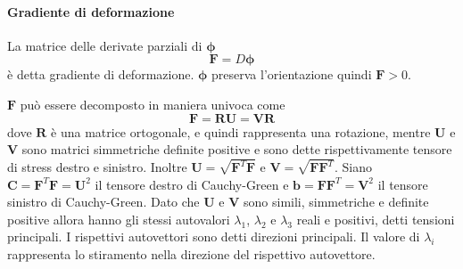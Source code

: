 \paragraph{Gradiente di deformazione}
La matrice delle derivate parziali di $\boldsymbol{\phi}$ 
$$ \mathbf{F} = D\boldsymbol{\phi}$$
è detta gradiente di deformazione.
$\boldsymbol{\phi}$ preserva l'orientazione quindi $\mathbf{F} > 0$. 

$\mathbf{F}$ può essere decomposto in maniera univoca come 
$$\mathbf{F}=\mathbf{R}\mathbf{U}=\mathbf{V}\mathbf{R}$$
dove $\mathbf{R}$ è una matrice ortogonale, e quindi rappresenta una rotazione, mentre $\mathbf{U}$ e $\mathbf{V}$ sono matrici simmetriche definite positive e sono dette rispettivamente tensore di stress destro e sinistro. 
Inoltre $\mathbf{U}=\sqrt{\mathbf{F}^T\mathbf{F}}$ e $\mathbf{V}=\sqrt{\mathbf{F}\mathbf{F}^T}$.
Siano $\mathbf{C}=\mathbf{F}^T\mathbf{F}=\mathbf{U}^2$ il tensore destro di Cauchy-Green e $\mathbf{b}=\mathbf{F}\mathbf{F}^T=\mathbf{V}^2$ il tensore sinistro di Cauchy-Green.
Dato che $\mathbf{U}$ e $\mathbf{V}$ sono simili, simmetriche e definite positive allora hanno gli stessi autovalori $\lambda_1$, $\lambda_2$ e $\lambda_3$ reali e positivi, detti tensioni principali. I rispettivi autovettori sono detti direzioni principali. Il valore di $\lambda_i$ rappresenta lo stiramento nella direzione del rispettivo autovettore.
